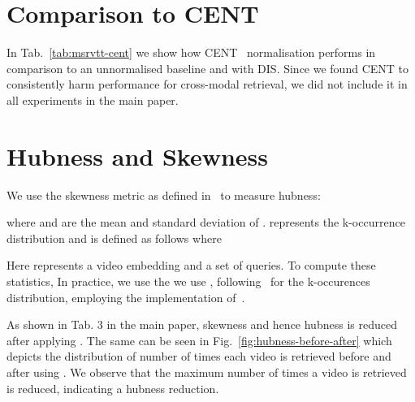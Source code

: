 \section{Comparison to CENT}
\label{sec:cent}
\begin{table}
\begin{center}
\end{center}
\vspace{\spacebefore{}}
\caption{\textbf{MSR-VTT full split} Comparison with CENT for a seed of TT-CE+\cite{croitoru2021teachtext} model. \label{tab:msrvtt-cent}}
\vspace{\spaceafter{}}
\end{table} 
In Tab.~\ref{tab:msrvtt-cent}
we show how CENT~\cite{suzuki2013centering} normalisation performs
in comparison to an unnormalised baseline and \methodNameLong with DIS.
Since we found CENT to consistently harm performance for cross-modal
retrieval, we did not include it in all experiments in the main paper.

\section{Hubness and Skewness}
\label{sec:skewness}
We use the skewness metric as defined in~\cite{radovanovic2010hubs} to measure hubness:


where  and  are the mean and standard deviation of .  represents the k-occurrence distribution and is defined as follows  where 


Here  represents a video embedding and  a set of queries.
To compute these statistics,
In practice, we use the we use , following~\cite{Feldbauer2018FastAH}
for the k-occurences distribution, employing the implementation of~\cite{Feldbauer2020}.


As shown in Tab. 3 in the main paper, skewness and hence hubness is reduced after applying \methodName. The same can be seen in Fig.~\ref{fig:hubness-before-after} which depicts the distribution of number of times each video is retrieved before and after using \methodName.
We observe that the maximum number of times a video
is retrieved is reduced, indicating a hubness reduction.

